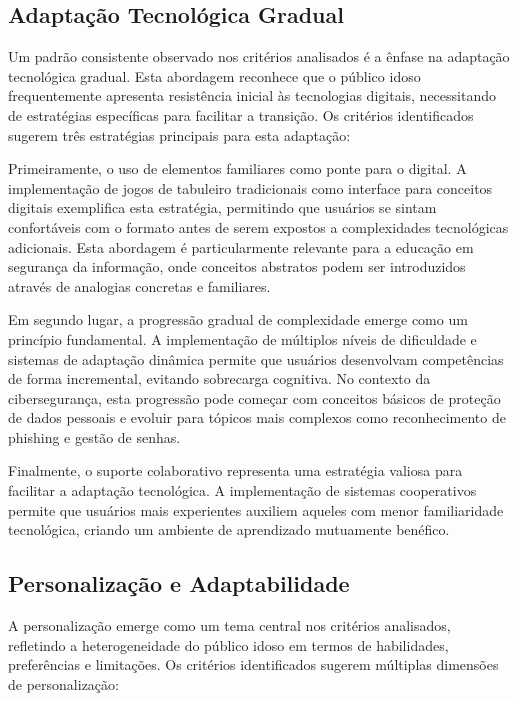 \begin{table}[H]
\subsection{Adaptação Tecnológica Gradual}
\label{subsec:adaptacao_gradual}

Um padrão consistente observado nos critérios analisados é a ênfase na adaptação tecnológica gradual. Esta abordagem reconhece que o público idoso frequentemente apresenta resistência inicial às tecnologias digitais, necessitando de estratégias específicas para facilitar a transição. Os critérios identificados sugerem três estratégias principais para esta adaptação:

Primeiramente, o uso de elementos familiares como ponte para o digital. A implementação de jogos de tabuleiro tradicionais como interface para conceitos digitais exemplifica esta estratégia, permitindo que usuários se sintam confortáveis com o formato antes de serem expostos a complexidades tecnológicas adicionais. Esta abordagem é particularmente relevante para a educação em segurança da informação, onde conceitos abstratos podem ser introduzidos através de analogias concretas e familiares.

Em segundo lugar, a progressão gradual de complexidade emerge como um princípio fundamental. A implementação de múltiplos níveis de dificuldade e sistemas de adaptação dinâmica permite que usuários desenvolvam competências de forma incremental, evitando sobrecarga cognitiva. No contexto da cibersegurança, esta progressão pode começar com conceitos básicos de proteção de dados pessoais e evoluir para tópicos mais complexos como reconhecimento de phishing e gestão de senhas.

Finalmente, o suporte colaborativo representa uma estratégia valiosa para facilitar a adaptação tecnológica. A implementação de sistemas cooperativos permite que usuários mais experientes auxiliem aqueles com menor familiaridade tecnológica, criando um ambiente de aprendizado mutuamente benéfico.

\subsection{Personalização e Adaptabilidade}
\label{subsec:personalizacao}

A personalização emerge como um tema central nos critérios analisados, refletindo a heterogeneidade do público idoso em termos de habilidades, preferências e limitações. Os critérios identificados sugerem múltiplas dimensões de personalização:


\end{table}
